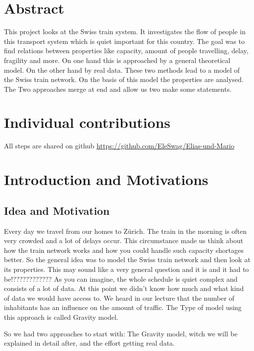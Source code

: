 \documentclass[11pt]{article}
\begin{document}
\section{Abstract}

This project looks at the Swiss train system. It investigates the flow of people in this transport system which is quiet important for this country. The goal was to find relations between properties like capacity, amount of people travelling, delay, fragility and more. On one hand this is approached  by a general theoretical model. On the other hand by real data. These two methods lead to a model of the Swiss train  network. On the basis of this model the properties are analysed. The Two approaches merge at end and allow us two make some statements.
 

\section{Individual contributions}

All steps are shared on github
\url{https://github.com/EleSwag/Elias-und-Mario}

\section{Introduction and Motivations}

\subsection{Idea and Motivation}


Every day we travel from our homes to Zürich. The train in the morning is often very crowded and a lot of delays occur. This circumstance made us think about how the train network works and how you could handle such capacity shortages better. 
So the general idea was to model the Swiss train network and then look at its properties. This may sound like a very general question and it is and it had to be!???????????? As you can imagine, the whole schedule is quiet complex and consists of a lot of data. At this point we didn't know how much and what kind of data we would have access to. We heard in our lecture that the number of inhabitants has an influence on the amount of traffic. The Type of model using this approach is called Gravity model.

So we had two approaches to start with: The Gravity model, witch we will be explained in detail after, and the effort getting real data.
\end{document}
